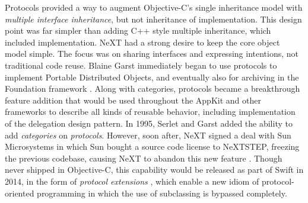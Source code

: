 \documentclass[acmsmall]{acmart}\settopmatter{}
\begin{document}
Protocols provided a way to augment Objective-C's single inheritance model with \emph{multiple interface inheritance}, but not inheritance of implementation. This design point was far simpler than adding C++ style multiple inheritance, which included implementation. NeXT had a strong desire to keep the core object model simple. The focus was on sharing interfaces and expressing intentions, not traditional code reuse. Blaine Garst immediately began to use protocols to implement Portable Distributed Objects, and eventually also for archiving in the Foundation framework \citep[54--55]{garst_oral_2016}. Along with categories, protocols became a breakthrough feature addition that would be used throughout the AppKit and other frameworks to describe all kinds of reusable behavior, including implementation of the delegation design pattern. In 1995, Serlet and Garst added the ability to add \emph{categories} on \emph{protocols}. However, soon after, NeXT signed a deal with Sun Microsystems in which Sun bought a source code license to NeXTSTEP, freezing the previous codebase, causing NeXT to abandon this new feature \citep[60--61]{garst_oral_2016}. Though never shipped in Objective-C, this capability would be released as part of Swift in 2014, in the form of \emph{protocol extensions} \citep{apple_inc_protocols_2020}, which enable a new idiom of protocol-oriented programming in which the use of subclassing is bypassed completely.
\end{document}
